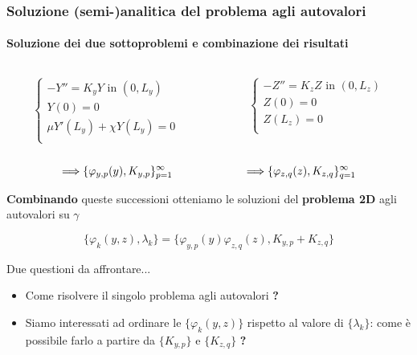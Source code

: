  \begin{frame}
 \frametitle{Soluzione (semi-)analitica del problema agli autovalori}
 \framesubtitle{Soluzione dei due sottoproblemi e combinazione dei risultati}
 \begin{columns}
 \footnotesize
  \begin{column}{0.5\textwidth}
  \begin{equation}
  \begin{cases}
   -Y''=K_yY \text{ in }(0,L_y)\\
   Y(0)=0\\
   \mu Y'(L_y)+\chi Y(L_y)=0\\
  \end{cases}
 \end{equation}
 \end{column}
  \begin{column}{0.5\textwidth}
      \begin{equation}
  \begin{cases}
   -Z''= K_zZ\text{ in }(0,L_z)\\
   Z(0)=0\\
   Z(L_z)=0\\   
  \end{cases}
 \end{equation}
\end{column}
\end{columns}

\begin{alertblock}{}
  $$\Longrightarrow\{\varphi_{y,p}(y),K_{y,p}\}_{p=1}^\infty\psp{38}\Longrightarrow\{\varphi_{z,q}(z),K_{z,q}\}_{q=1}^\infty$$
\end{alertblock}

\textbf{Combinando} queste successioni otteniamo le 
 soluzioni del \textbf{problema 2D} agli autovalori su $\gamma$
 \begin{alertblock}{}
 \begin{equation}
  \{\varphi_k(y,z),\lambda_k\}=\{\varphi_{y,p}(y)\varphi_{z,q}(z),K_{y,p}+K_{z,q}\}
 \end{equation}
 \end{alertblock}
 Due questioni da affrontare...
 \begin{itemize}
  \item Come risolvere il singolo problema agli autovalori \textbf{?}
  \item Siamo interessati ad ordinare le $\{\varphi_k(y,z)\}$ rispetto al valore di $\{\lambda_k\}$: come \`e possibile farlo
a partire da $\{K_{y,p}\}$ e $\{K_{z,q}\}$ \textbf{?}
 \end{itemize}
 \end{frame}
